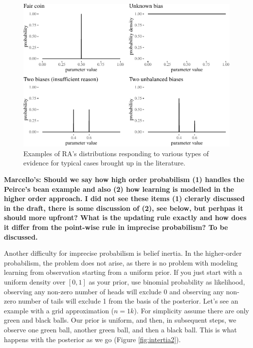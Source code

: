 \documentclass[
  10pt,
  dvipsnames,enabledeprecatedfontcommands]{scrartcl}
\begin{document}
\begin{figure}


\begin{center}\includegraphics[width=1\linewidth]{chapter-outline_files/figure-latex/fig:evidenceResponse-1} \end{center}
\caption{Examples of RA's distributions responding to various types of evidence for typical cases brought up in the literature.}



\label{fig:evidenceResponse}
\end{figure}

\textbf{Marcello's: Should we say how high order probabilism (1) handles the Peirce's bean example and also (2) how learning is modelled in the higher order approach. I did not see these items (1) clerarly discussed in the draft, there is some discussion of (2), see below, but perhpas it should more upfront? What is the updating rule exactly and how does it differ from the point-wise rule in imprecise probabilism? To be discussed.}

Another difficulty for imprecise probabilism is belief inertia. In the
higher-order probabilism, the problem does not arise, as there is no
problem with modeling learning from observation starting from a uniform
prior. If you just start with a uniform density over \([0,1]\) as your
prior, use binomial probability as likelihood, observing any non-zero
number of heads will exclude 0 and observing any non-zero number of
tails will exclude 1 from the basis of the posterior. Let's see an
example with a grid approximation (\(n=1k\)). For simplicity assume
there are only green and black balls. Our prior is uniform, and then, in
subsequent steps, we observe one green ball, another green ball, and
then a black ball. This is what happens with the posterior as we go
(Figure \ref{fig:intertia2}).
\end{document}
